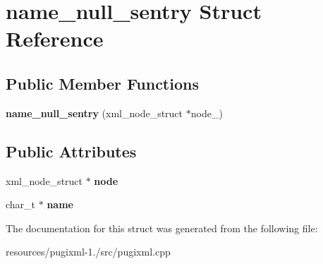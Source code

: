 \hypertarget{structname__null__sentry}{\section{name\+\_\+null\+\_\+sentry Struct Reference}
\label{structname__null__sentry}
}
\subsection*{Public Member Functions}
\begin{DoxyCompactItemize}
\item 
\hypertarget{structname__null__sentry_ae5d1789457736acd9d669bc4765bd811}{{\bfseries name\+\_\+null\+\_\+sentry} (xml\+\_\+node\+\_\+struct $\ast$node\+\_\+)}\label{structname__null__sentry_ae5d1789457736acd9d669bc4765bd811}

\end{DoxyCompactItemize}
\subsection*{Public Attributes}
\begin{DoxyCompactItemize}
\item 
\hypertarget{structname__null__sentry_ab85be926948869639d135bc03324a6f0}{xml\+\_\+node\+\_\+struct $\ast$ {\bfseries node}}\label{structname__null__sentry_ab85be926948869639d135bc03324a6f0}

\item 
\hypertarget{structname__null__sentry_a8847bb799593cb873c863ab6f88299d6}{char\+\_\+t $\ast$ {\bfseries name}}\label{structname__null__sentry_a8847bb799593cb873c863ab6f88299d6}

\end{DoxyCompactItemize}


The documentation for this struct was generated from the following file\+:\begin{DoxyCompactItemize}
\item 
resources/pugixml-\/1./src/pugixml.\+cpp\end{DoxyCompactItemize}
